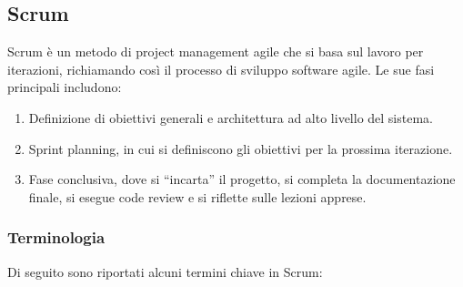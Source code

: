 \subsection{Scrum}
Scrum è un metodo di project management agile che si basa sul lavoro per iterazioni, richiamando così il processo di sviluppo software agile.
Le sue fasi principali includono:

\begin{enumerate}
    \item Definizione di obiettivi generali e architettura ad alto livello del sistema.
    \item Sprint planning, in cui si definiscono gli obiettivi per la prossima iterazione.
    \item Fase conclusiva, dove si ``incarta'' il progetto,
    si completa la documentazione finale, si esegue code review e
    si riflette sulle lezioni apprese.
\end{enumerate}

\subsubsection{Terminologia}
Di seguito sono riportati alcuni termini chiave in Scrum:

